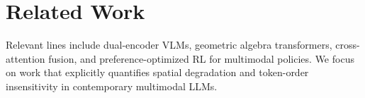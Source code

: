 \section{Related Work}
Relevant lines include dual-encoder VLMs, geometric algebra transformers, cross-attention fusion,
and preference-optimized RL for multimodal policies. We focus on work that explicitly quantifies
spatial degradation and token-order insensitivity in contemporary multimodal LLMs.
